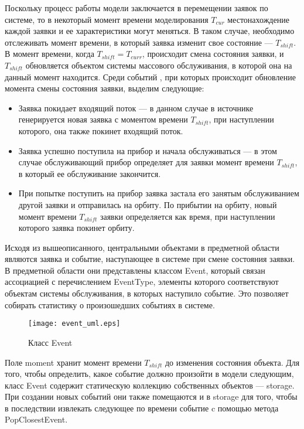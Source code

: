  Поскольку процесс работы модели заключается в перемещении заявок по системе, то в некоторый момент времени моделирования $T_{cur}$ местонахождение каждой заявки и ее характеристики могут меняться. В таком случае, необходимо отслеживать момент времени, в который заявка изменит свое состояние --- $T_{shift}$. В момент времени, когда $T_{shift} = T_{curr}$,  происходит смена состояния заявки, и  $T_{shift}$ обновляется объектом системы массового обслуживания, в которой она на данный момент находится. Среди событий , при которых происходит обновление момента смены состояния заявки, выделим следующие:
\begin{itemize}
	\item Заявка покидает входящий поток --- в данном случае в источнике генерируется новая заявка с моментом времени $T_{shift}$, при наступлении которого, она также покинет входящий поток.
	\item Заявка успешно поступила на прибор и начала обслуживаться --- в этом случае обслуживающий прибор определяет для заявки момент времени $T_{shift}$, в который ее обслуживание закончится.
	\item При попытке поступить на прибор заявка застала его занятым обслуживанием другой заявки и отправилась на орбиту. По прибытии на орбиту, новый момент времени $T_{shift}$ заявки определяется как время, при наступлении которого заявка покинет орбиту.
\end{itemize}

Исходя из вышеописанного, центральными объектами в предметной области являются заявка и событие, наступающее в системе при смене состояния заявки. В предметной области они представлены классом Event, который связан ассоциацией с перечислением EventType, элементы которого соответствуют объектам системы обслуживания, в которых наступило  событие. Это позволяет собирать статистику о произошедших событиях в системе.
\begin{figure}[H]
	\centering
	\texttt{[image: event\_uml.eps]}
	\caption{Класс Event}
	\label{event_uml}
\end{figure}
Поле moment хранит момент времени $T_{shift}$ до изменения состояния объекта. Для того, чтобы определить, какое событие должно произойти в модели следующим, класс Event содержит статическую коллекцию собственных объектов --- storage. При создании новых событий они также помещаются и в storage для того, чтобы в последствии извлекать следующее по времени событие c помощью метода PopClosestEvent.

